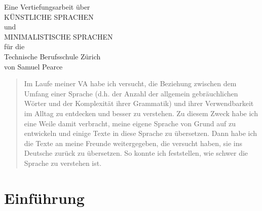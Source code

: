 \documentclass{article}
\begin{document}
%

\begingroup
\centering
\vfill
\Large{Eine Vertiefungsarbeit über}\\
\Huge{KÜNSTLICHE SPRACHEN}\\
\huge{und}\\
\huge{MINIMALISTISCHE SPRACHEN}\\
\large{für die}\\
\Large{Technische Berufsschule Zürich}\\
\vspace{3cm}
\Large{von Samuel Pearce}\\
\vfill\null
\endgroup
\thispagestyle{empty}

%
% 

\begin{abstract}
    Im Laufe meiner VA habe ich versucht, die Beziehung zwischen dem Umfang einer Sprache
    (d.h. der Anzahl der allgemein gebräuchlichen Wörter und der Komplexität ihrer Grammatik)
    und ihrer Verwendbarkeit im Alltag zu entdecken und besser zu verstehen.
    Zu diesem Zweck habe ich eine Weile damit verbracht, meine eigene Sprache von Grund auf zu
    entwickeln und einige Texte in diese Sprache zu übersetzen. Dann habe ich die Texte an meine
    Freunde weitergegeben, die versucht haben, sie ins Deutsche zurück zu übersetzen.
    So konnte ich feststellen, wie schwer die Sprache zu verstehen ist.
\end{abstract}
\pagebreak

\tableofcontents
\pagebreak



\section{Einführung}
\end{document}

